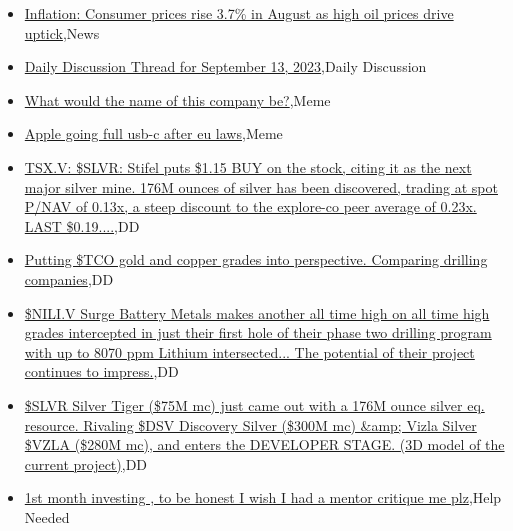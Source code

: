 \documentclass{article}%
\begin{document}
%
\begin{itemize}%
\item%
\href{https://reddit.com/r/wallstreetbets/comments/16hlx0g/inflation\_consumer\_prices\_rise\_37\_in\_august\_as/}{Inflation: Consumer prices rise 3.7\% in August as high oil prices drive uptick},News%
\item%
\href{https://reddit.com/r/wallstreetbets/comments/16hixu4/daily\_discussion\_thread\_for\_september\_13\_2023/}{Daily Discussion Thread for September 13, 2023},Daily Discussion%
\item%
\href{https://reddit.com/r/wallstreetbets/comments/16hf3p9/what\_would\_the\_name\_of\_this\_company\_be/}{What would the name of this company be?},Meme%
\item%
\href{https://reddit.com/r/wallstreetbets/comments/16hf0io/apple\_going\_full\_usbc\_after\_eu\_laws/}{Apple going full usb-c after eu laws},Meme%
\item%
\href{https://reddit.com/r/Baystreetbets/comments/16hd9vq/tsxv\_slvr\_stifel\_puts\_115\_buy\_on\_the\_stock\_citing/}{TSX.V: \$SLVR: Stifel puts \$1.15 BUY on the stock, citing it as the next major silver mine. 176M ounces of silver has been discovered, trading at spot P/NAV of 0.13x, a steep discount to the explore-co peer average of 0.23x. LAST \$0.19....},DD%
\item%
\href{https://reddit.com/r/Baystreetbets/comments/16gycv3/putting\_tco\_gold\_and\_copper\_grades\_into/}{Putting \$TCO gold and copper grades into perspective. Comparing drilling companies},DD%
\item%
\href{https://reddit.com/r/Baystreetbets/comments/16gx4iw/niliv\_surge\_battery\_metals\_makes\_another\_all\_time/}{\$NILI.V Surge Battery Metals makes another all time high on all time high grades intercepted in just their first hole of their phase two drilling program with up to 8070 ppm Lithium intersected... The potential of their project continues to impress.},DD%
\item%
\href{https://reddit.com/r/Baystreetbets/comments/16gtyik/slvr\_silver\_tiger\_75m\_mc\_just\_came\_out\_with\_a/}{\$SLVR Silver Tiger (\$75M mc) just came out with a 176M ounce silver eq. resource. Rivaling \$DSV Discovery Silver (\$300M mc) \&amp; Vizla Silver \$VZLA (\$280M mc), and enters the DEVELOPER STAGE. (3D model of the current project)},DD%
\item%
\href{https://reddit.com/r/StockMarket/comments/16h72p1/1st\_month\_investing\_to\_be\_honest\_i\_wish\_i\_had\_a/}{1st month investing , to be honest I wish I had a mentor critique me plz},Help Needed%

\end{itemize}
\end{document}

